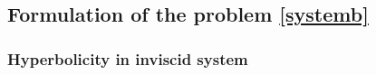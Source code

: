 \documentclass{amsart}
\def\blue{\color{blue}}
\theoremstyle{definition}
\numberwithin{equation}{section}
\begin{document}





\subsection{Formulation of the problem \eqref{systemb}}

\subsubsection{Hyperbolicity in inviscid system}
\end{document}
